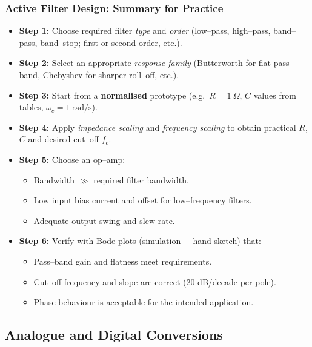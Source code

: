 \begin{frame}
	\frametitle{Active Filter Design: Summary for Practice}
	\begin{itemize}
		\item \textbf{Step 1:} Choose required filter \emph{type} and \emph{order}
			(low–pass, high–pass, band–pass, band–stop; first or second order, etc.).
		\item \textbf{Step 2:} Select an appropriate \emph{response family}
			(Butterworth for flat pass–band, Chebyshev for sharper roll–off, etc.).
		\item \textbf{Step 3:} Start from a \textbf{normalised} prototype
			(e.g.\ $R=1~\Omega$, $C$ values from tables, $\omega_c=1~\text{rad/s}$).
		\item \textbf{Step 4:} Apply \emph{impedance scaling} and \emph{frequency scaling}
			to obtain practical $R$, $C$ and desired cut–off $f_c$.
		\item \textbf{Step 5:} Choose an op–amp:
			\begin{itemize}
				\item Bandwidth $\gg$ required filter bandwidth.
				\item Low input bias current and offset for low–frequency filters.
				\item Adequate output swing and slew rate.
			\end{itemize}
		\item \textbf{Step 6:} Verify with Bode plots (simulation + hand sketch) that:
			\begin{itemize}
				\item Pass–band gain and flatness meet requirements.
				\item Cut–off frequency and slope are correct
						($20$ dB/decade per pole).
				\item Phase behaviour is acceptable for the intended application.
			\end{itemize}
	\end{itemize}
\end{frame}

\subsection{Analogue and Digital Conversions}

